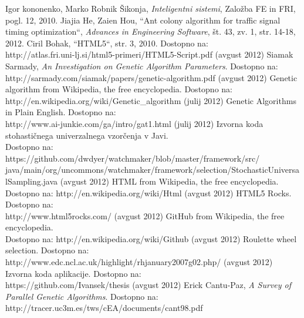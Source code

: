\documentclass[a4paper, 12pt]{book}
\begin{document}
 
\begin{thebibliography}{99}
\raggedright
{} Igor kononenko, Marko Robnik \v Sikonja, \textit{Inteligentni sistemi}, Zalo\v zba FE in FRI, pogl. 12, 2010.
 Jiajia He, Zaien Hou, ``Ant colony algorithm for traffic signal timing optimization``, \textit{Advances in Engineering Software}, \v st. 43, zv. 1, str.  14-18, 2012.
 Ciril Bohak, ``HTML5``, str. 3, 2010. Dostopno na:\\
http://atlas.fri.uni-lj.si/html5-primeri/HTML5-Script.pdf
 (avgust 2012) Siamak Sarmady, \textit{An Investigation on Genetic Algorithm Parameters}. Dostopno na:\\ 
http://sarmady.com/siamak/papers/genetic-algorithm.pdf
 (avgust 2012) Genetic algorithm from Wikipedia, the free encyclopedia. Dostopno na: http://en.wikipedia.org/wiki/Genetic\_algorithm
 (julij 2012) Genetic Algorithms in Plain English. Dostopno na:\\
http://www.ai-junkie.com/ga/intro/gat1.html
 (julij 2012) Izvorna koda stohasti\v cnega univerzalnega vzor\v cenja v Javi.\\ Dostopno na: https://github.com/dwdyer/watchmaker/blob/master/framework/src/
java/main/org/uncommons/watchmaker/framework/selection/StochasticUniversalSampling.java
\newpage
{} (avgust 2012) HTML from Wikipedia, the free encyclopedia. \\
Dostopno na: http://en.wikipedia.org/wiki/Html
 (avgust 2012) HTML5 Rocks. Dostopno na:\\
http://www.html5rocks.com/
 (avgust 2012) GitHub from Wikipedia, the free encyclopedia.\\
Dostopno na: http://en.wikipedia.org/wiki/Github
(avgust 2012) Roulette wheel selection. Dostopno na:\\
http://www.edc.ncl.ac.uk/highlight/rhjanuary2007g02.php/
(avgust 2012) Izvorna koda aplikacije. Dostopno na:\\
https://github.com/Ivansek/thesis
(avgust 2012) Erick Cantu-Paz, \textit{A Survey of Parallel Genetic Algorithms}. Dostopno na: http://tracer.uc3m.es/tws/cEA/documents/cant98.pdf
\end{thebibliography}
\end{document}
